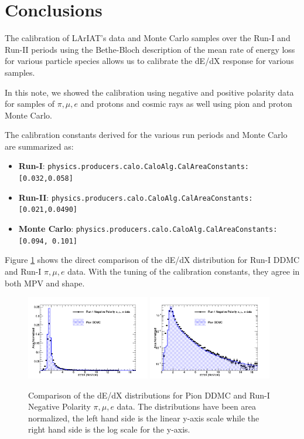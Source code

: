 \section{Conclusions}\label{sec:Conclusion}

The calibration of LArIAT's data and Monte Carlo samples over the Run-I and Run-II periods using the Bethe-Bloch description of the mean rate of energy loss for various particle species allows us to calibrate the dE/dX response for various samples.

In this note, we showed the calibration using negative and positive polarity data for samples of $\pi, \mu, e$ and protons and cosmic rays as well using pion and proton Monte Carlo.

The calibration constants derived for the various run periods and Monte Carlo are summarized as:

\begin{itemize}
\item \textbf{Run-I}: \verb!physics.producers.calo.CaloAlg.CalAreaConstants: [0.032,0.058]!

\item \textbf{Run-II}: \verb!physics.producers.calo.CaloAlg.CalAreaConstants: [0.021,0.0490]!

\item \textbf{Monte Carlo}: \verb!physics.producers.calo.CaloAlg.CalAreaConstants: [0.094, 0.101]!
\end{itemize}


Figure \ref{fig:PionCompareDataAndMC} shows the direct comparison of the dE/dX distribution for Run-I DDMC and Run-I $\pi, \mu, e$ data. With the tuning of the calibration constants, they agree in both MPV and shape. 

\begin{figure}[htb]
\centering
\includegraphics[width=0.48\textwidth]{images/dEdXPionDataMCcompare.png}
\includegraphics[width=0.48\textwidth]{images/dEdXPionDataMCcompareLog.png}
\caption{Comparison of the dE/dX distributions for Pion DDMC and Run-I Negative Polarity $\pi, \mu, e$ data. The distributions have been area normalized, the left hand side is the linear y-axis scale while the right hand side is the log scale for the y-axis.}
\label{fig:PionCompareDataAndMC}
\end{figure}

